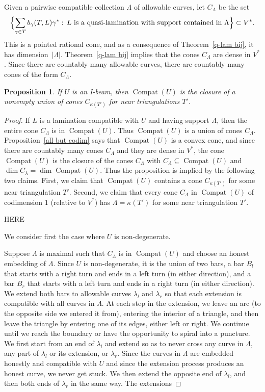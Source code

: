 \documentclass{amsart}
\newtheorem{prop}[proposition]{Proposition}
\theoremstyle{definition}
\theoremstyle{remark}
\numberwithin{equation}{section}
\newcommand{\settt}[1]{{\Bigl\lbrace #1 \Bigr\rbrace}}
\newcommand{\0}{{\mathbf{0}}}
\newcommand{\Compat}{\operatorname{Compat}}
\begin{document}
Given a pairwise compatible collection $\Lambda$ of allowable curves, let $C_\Lambda$ be the set
\[\settt{\sum_{\gamma\in T}b_\gamma(T,L)\gamma^*:\,L\text{ is a quasi-lamination with support contained in }\Lambda}\subset V^*.\]
This is a pointed rational cone, and as a consequence of Theorem~\ref{q-lam bij}, it has dimension~$|\Lambda|$.
Theorem~\ref{q-lam bij} implies that the cones $C_\Lambda$ are dense in $V^*$.
Since there are countably many allowable curves, there are countably many cones of the form $C_\Lambda$.


\begin{prop}\label{wall union}
If $U$ is an I-beam, then $\Compat(U)$ is the closure of a nonempty union of cones $C_{\kappa(T')}$ for near triangulations $T'$.
\end{prop}

\begin{proof}
If $L$ is a lamination compatible with $U$ and having support $\Lambda$, then the entire cone $C_\Lambda$ is in $\Compat(U)$.
Thus $\Compat(U)$ is a union of cones $C_\Lambda$.
Proposition~\ref{all but codim} says that $\Compat(U)$ is a convex cone, and since there are countably many cones $C_\Lambda$ and they are dense in $V^*$, the cone $\Compat(U)$ is the closure of the cones $C_\Lambda$ with $C_\Lambda\subseteq\Compat(U)$ and $\dim C_\lambda=\dim\Compat(U)$.
Thus the proposition is implied by the following two claims.
First, we claim that $\Compat(U)$ contains a cone $C_{\kappa(T')}$ for some near triangulation $T'$.
Second, we claim that every cone $C_\Lambda$ in $\Compat(U)$ of codimension $1$ (relative to $V^*$) has $\Lambda=\kappa(T')$ for some near triangulation $T'$.

HERE







We consider first the case where $U$ is non-degenerate.

Suppose $\Lambda$ is maximal such that $C_\Lambda$ is in $\Compat(U)$ and choose an honest embedding of $\Lambda$.
Since $U$ is non-degenerate, it is the union of two bars, a bar $B_l$ that starts with a right turn and ends in a left turn (in either direction), and a bar $B_r$ that starts with a left turn and ends in a right turn (in either direction).
We extend both bars to allowable curves $\lambda_l$ and $\lambda_r$ so that each extension is compatible with all curves in $\Lambda$.
At each step in the extension, we leave an arc (to the opposite side we entered it from), entering the interior of a triangle, and then leave the triangle by entering one of its edges, either left or right.
We continue until we reach the boundary or have the opportunity to  spiral into a puncture.
We first start from an end of $\lambda_l$ and extend so as to never cross any curve in $\Lambda$, any part of $\lambda_l$ or its extension, or $\lambda_r$.
Since the curves in $\Lambda$ are embedded honestly and compatible with $U$ and since the extension process produces an honest curve, we never get stuck.
We then extend the opposite end of $\lambda_l$, and then both ends of $\lambda_r$ in the same way.
The extensions 


\end{proof}
\end{document}
